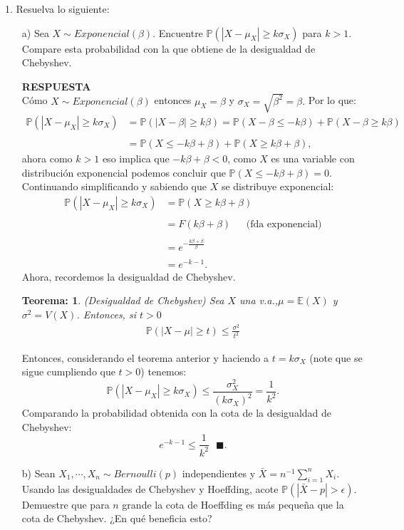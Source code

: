 \documentclass[11pt,letterpaper]{article}
\newcommand{\mP}{\mathbb{P}}
\newcommand{\mE}{\mathbb{E}}
\newcommand{\res}{\textbf{RESPUESTA}\\}
\newcommand{\finf}{\blacksquare.}
\newtheorem{thm}{Teorema:}
\begin{document}
1. Resuelva lo siguiente:
\begin{itemize}
\item[a)] Sea $X\sim Exponencial(\beta)$. Encuentre $\mP(|X-\mu_X |\geq k\sigma_X)$ para $k>1$. Compare esta probabilidad con la que obtiene de la desigualdad de Chebyshev. 

\res 
Cómo $X\sim Exponencial(\beta)$ entonces $\mu_X=\beta$ y $\sigma_X=\sqrt{\beta^2}=\beta.$ Por lo que:
\begin{align*}
\mP(|X-\mu_X |\geq k\sigma_X)&=\mP(|X-\beta|\geq k\beta)=\mP(X-\beta\leq -k\beta)+\mP(X-\beta\geq k\beta)\\ \\
&=\mP(X\leq -k\beta+\beta)+\mP(X\geq k\beta+\beta),
\end{align*}
ahora como $k>1$ eso implica que $-k\beta +\beta<0$, como $X$ es una variable con distribución exponencial podemos concluir que $\mP(X\leq -k\beta+\beta)=0$. Continuando simplificando y sabiendo que $X$ se distribuye exponencial:
\begin{align*}
\mP(|X-\mu_X |\geq k\sigma_X)&=\mP(X\geq k\beta+\beta)\\ \\
&=F(k\beta+\beta) \ \ \ \ \ \ \  \text{(fda exponencial)}\\ \\
&=e^{-\frac{k\beta+\beta}{\beta}}\\ \\
&=e^{-k-1}.
\end{align*}
Ahora, recordemos la desigualdad de Chebyshev.
\begin{framed}
    \begin{thm} \label{chebyshev}
    (Desigualdad de Chebyshev) Sea $X$ una v.a.,$\mu=\mE(X)$ y $\sigma^2=V(X)$. Entonces, si $t>0$
        \begin{align}
            \mP(|X-\mu|\geq t) \leq \frac{\sigma^2}{t^2}
        \end{align}
    \end{thm}
\end{framed} 
Entonces, considerando el teorema anterior y haciendo a $t=k\sigma_X$ (note que se sigue cumpliendo que $t>0$) tenemos:
$$\mP(|X-\mu_X|\geq k\sigma_X) \leq \frac{\sigma_X^2}{(k\sigma_X)^2}=\frac{1}{k^2}.$$
Comparando la probabilidad obtenida con la cota de la desigualdad de Chebyshev:
$$e^{-k-1}\leq \frac{1}{k^2}\ \ \ \finf$$
\item[b)] Sean $X_1,\cdots,X_n\sim Bernoulli(p)$ independientes y $\bar{X}=n^{-1}\sum_{i=1}^n X_i$. Usando las desigualdades de Chebyshev y Hoeffding, acote $\mP(|\bar{X}-p|>\epsilon)$. Demuestre que para $n$ grande la cota de Hoeffding es más pequeña que la cota de Chebyshev. ¿En qué beneficia esto?
\end{itemize}
\end{document}

